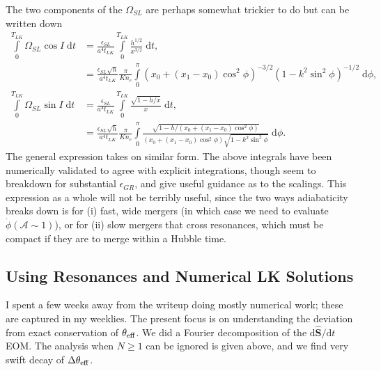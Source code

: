 \documentclass[11pt,
        usenames, %
        dvipsnames %
    ]{article}
\newcommand*{\rdil}[2]{\mathrm{d}#1 / \mathrm{d}#2}
\newcommand*{\bm}[1]{\boldsymbol{\mathbf{#1}}}
\newcommand*{\uv}[1]{\hat{\bm{#1}}}
\newcommand*{\p}[1]{\left(#1\right)}
\begin{document}
The two components of the $\Omega_{SL}$ are perhaps somewhat trickier to do but
can be written down
\begin{align}
    \int\limits_0^{T_{LK}}\Omega_{SL} \cos I\;\mathrm{d}t
        &= \frac{\epsilon_{SL}}{a^4t_{LK}}\int\limits_0^{T_{LK}}
            \frac{h^{1/2}}{x^{3/2}}\;\mathrm{d}t,\\
        &= \frac{\epsilon_{SL}\sqrt{h}}{a^4t_{LK}}\frac{\pi}{K n_e}
            \int\limits_0^\pi
                \p{x_0 + (x_1 - x_0)\cos^2\phi}^{-3/2}
                    \p{1 - k^2\sin^2\phi}^{-1/2} \;\mathrm{d}\phi,\\
    \int\limits_0^{T_{LK}}\Omega_{SL} \sin I\;\mathrm{d}t
        &= \frac{\epsilon_{SL}}{a^4t_{LK}}\int\limits_0^{T_{LK}}
            \frac{\sqrt{1 - h/x}}{x}\;\mathrm{d}t,\\
        &= \frac{\epsilon_{SL}\sqrt{h}}{a^4t_{LK}}\frac{\pi}{K n_e}
            \int\limits_0^\pi
                \frac{\sqrt{1 - h/\p{x_0 + (x_1 - x_0)\cos^2\phi}}}{
                    \p{x_0 + (x_1 - x_0)\cos^2\phi}\sqrt{1 - k^2\sin^2\phi}}
                    \;\mathrm{d}\phi.
\end{align}
The general expression takes on similar form. The above integrals have been
numerically validated to agree with explicit integrations, though seem to
breakdown for substantial $\epsilon_{GR}$, and give useful guidance as to the
scalings. This expression as a whole will not be terribly useful, since the two
ways adiabaticity breaks down is for (i) fast, wide mergers (in which case we
need to evaluate $\dot{\phi}\p{\mathcal{A} \sim 1}$), or for (ii) slow mergers
that cross resonances, which must be compact if they are to merge within a
Hubble time.

\subsection{Using Resonances and Numerical LK Solutions}

I spent a few weeks away from the writeup doing mostly numerical work; these are
captured in my weeklies. The present focus is on understanding the deviation
from exact conservation of $\theta_{\rm eff}$. We did a Fourier decomposition of
the $\rdil{\uv{S}}{t}$ EOM\@. The analysis when $N \geq 1$ can be ignored is
given above, and we find very swift decay of $\Delta \theta_{\rm eff}$.
\end{document}
